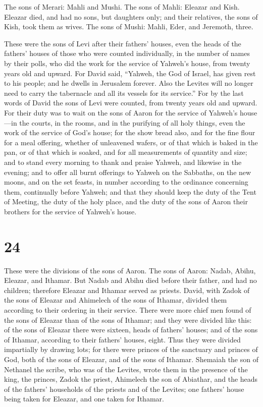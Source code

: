  The sons of Merari: Mahli and Mushi. The sons of Mahli:
Eleazar and Kish.  Eleazar died, and had no sons, but
daughters only; and their relatives, the sons of Kish, took them as
wives.  The sons of Mushi: Mahli, Eder, and Jeremoth,
three.

 These were the sons of Levi after their fathers' houses,
even the heads of the fathers' houses of those who were counted
individually, in the number of names by their polls, who did the work
for the service of Yahweh's house, from twenty years old and upward.
 For David said, ``Yahweh, the God of Israel, has given
rest to his people; and he dwells in Jerusalem forever. 
Also the Levites will no longer need to carry the tabernacle and all its
vessels for its service.''  For by the last words of David
the sons of Levi were counted, from twenty years old and upward.
 For their duty was to wait on the sons of Aaron for the
service of Yahweh's house---in the courts, in the rooms, and in the
purifying of all holy things, even the work of the service of God's
house;  for the show bread also, and for the fine flour for
a meal offering, whether of unleavened wafers, or of that which is baked
in the pan, or of that which is soaked, and for all measurements of
quantity and size;  and to stand every morning to thank and
praise Yahweh, and likewise in the evening;  and to offer
all burnt offerings to Yahweh on the Sabbaths, on the new moons, and on
the set feasts, in number according to the ordinance concerning them,
continually before Yahweh;  and that they should keep the
duty of the Tent of Meeting, the duty of the holy place, and the duty of
the sons of Aaron their brothers for the service of Yahweh's house.

\hypertarget{section-23}{%
\section{24}\label{section-23}}

 These were the divisions of the sons of Aaron. The sons of
Aaron: Nadab, Abihu, Eleazar, and Ithamar.  But Nadab and
Abihu died before their father, and had no children; therefore Eleazar
and Ithamar served as priests.  David, with Zadok of the
sons of Eleazar and Ahimelech of the sons of Ithamar, divided them
according to their ordering in their service.  There were
more chief men found of the sons of Eleazar than of the sons of Ithamar;
and they were divided like this: of the sons of Eleazar there were
sixteen, heads of fathers' houses; and of the sons of Ithamar, according
to their fathers' houses, eight.  Thus they were divided
impartially by drawing lots; for there were princes of the sanctuary and
princes of God, both of the sons of Eleazar, and of the sons of Ithamar.
 Shemaiah the son of Nethanel the scribe, who was of the
Levites, wrote them in the presence of the king, the princes, Zadok the
priest, Ahimelech the son of Abiathar, and the heads of the fathers'
households of the priests and of the Levites; one fathers' house being
taken for Eleazar, and one taken for Ithamar.

